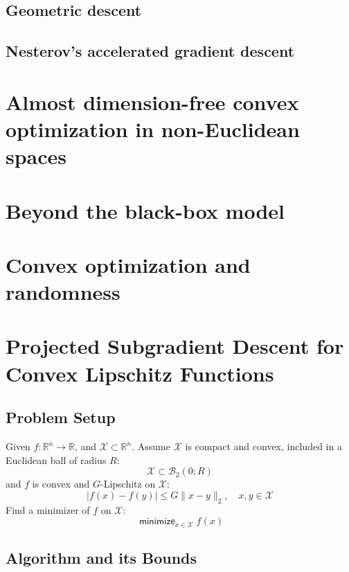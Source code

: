 \documentclass{scrartcl}
\DeclareMathOperator*{\minimize}{\mathsf{minimize}}
\newcommand{\RR}{\mathbb{R}}
\newcommand{\sB}{\mathcal{B}}
\newcommand{\sX}{\mathcal{X}}
\begin{document}
\subsection{Geometric descent}
\subsection{Nesterov's accelerated gradient descent}

\section{Almost dimension-free convex optimization in non-Euclidean spaces}
\section{Beyond the black-box model}
\section{Convex optimization and randomness}

\section{Projected Subgradient Descent for Convex Lipschitz Functions}

\subsection{Problem Setup}

\begin{problem}
  Given $f:\RR^n\rightarrow\RR$, and $\sX\subset\RR^n$. Assume $\sX$ is compact and convex, included
  in a Euclidean ball of radius $R$:
  \begin{equation}
    \sX \subset \sB_2(0; R)
  \end{equation}
  and $f$ is convex and $G$-Lipschitz on $\sX$:
  \begin{equation}
    |f(x)-f(y)| \leq G\|x-y\|_2, \quad x,y\in\sX
  \end{equation}
  Find a minimizer of $f$ on $\sX$:
  \[
  \minimize_{x\in\sX} f(x)
  \]
  \label{prob:projected-subgradient-descent}
\end{problem}

\subsection{Algorithm and its Bounds}
\end{document}
